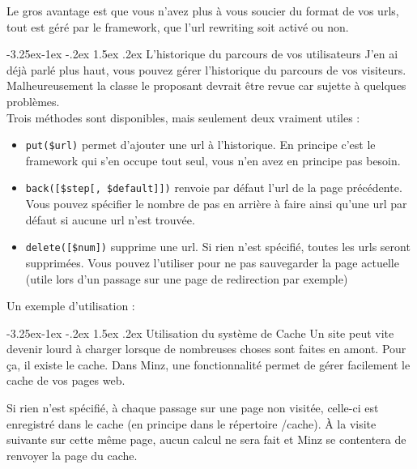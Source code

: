 \documentclass[a4paper,11pt]{article}
\makeatletter
\renewcommand{\subsection}{\@startsection{subsection}{2}{\z@}%
             {-3.25ex\@plus -1ex \@minus -.2ex}%
             {1.5ex \@plus .2ex}%
             {\color{bleuFonce}\normalfont\large\bfseries}}
\makeatother
\begin{document}
Le gros avantage est que vous n'avez plus à vous soucier du format de vos urls, tout est géré par le framework, que l'url rewriting soit activé ou non.

\subsection{L'historique du parcours de vos utilisateurs}
J'en ai déjà parlé plus haut, vous pouvez gérer l'historique du parcours de vos visiteurs. Malheureusement la classe le proposant devrait être revue car sujette à quelques problèmes.\\

Trois méthodes sont disponibles, mais seulement deux vraiment utiles :
\begin{itemize}
  \item \texttt{put(\$url)} permet d'ajouter une url à l'historique. En principe c'est le framework qui s'en occupe tout seul, vous n'en avez en principe pas besoin.
  \item \texttt{back([\$step[, \$default]])} renvoie par défaut l'url de la page précédente. Vous pouvez spécifier le nombre de pas en arrière à faire ainsi qu'une url par défaut si aucune url n'est trouvée.
  \item \texttt{delete([\$num])} supprime une url. Si rien n'est spécifié, toutes les urls seront supprimées. Vous pouvez l'utiliser pour ne pas sauvegarder la page actuelle (utile lors d'un passage sur une page de redirection par exemple)
\end{itemize}

Un exemple d'utilisation :

\subsection{Utilisation du système de Cache}
Un site peut vite devenir lourd à charger lorsque de nombreuses choses sont faites en amont. Pour ça, il existe le cache. Dans Minz, une fonctionnalité permet de gérer facilement le cache de vos pages web.

Si rien n'est spécifié, à chaque passage sur une page non visitée, celle-ci est enregistré dans le cache (en principe dans le répertoire /cache). À la visite suivante sur cette même page, aucun calcul ne sera fait et Minz se contentera de renvoyer la page du cache.
\end{document}
